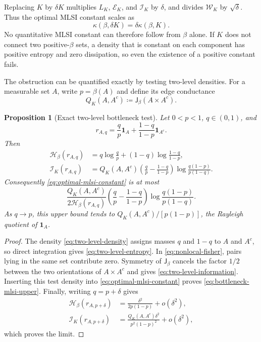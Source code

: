 \documentclass[11pt]{article}
\newtheorem{proposition}[theorem]{Proposition}
\theoremstyle{definition}
\newcommand{\one}{\mathbf 1}
\newcommand{\cE}{\mathcal E}
\newcommand{\cI}{\mathcal I}
\newcommand{\cH}{\mathcal H}
\newcommand{\cW}{\mathcal W}
\newcommand{\Jm}{\mathsf J}
\begin{document}
Replacing $K$ by $\delta K$ multiplies $L_K$, $\cE_K$, and $\cI_K$ by
$\delta$, and divides $\cW_K$ by $\sqrt\delta$.  Thus the optimal MLSI
constant scales as
\begin{equation}\label{eq:kernel-scaling-pl}
  \kappa(\beta,\delta K)=\delta\kappa(\beta,K).
\end{equation}
No quantitative MLSI constant can therefore follow from $\beta$ alone.
If $K$ does not connect two positive-$\beta$ sets, a density that is constant
on each component has positive entropy and zero dissipation, so even the
existence of a positive constant fails.

The obstruction can be quantified exactly by testing two-level densities.
For a measurable set $A$, write $p=\beta(A)$ and define its edge conductance
\begin{equation}\label{eq:edge-conductance}
  Q_K(A,A^c)\coloneqq\Jm_\beta(A\times A^c).
\end{equation}

\begin{proposition}[Exact two-level bottleneck test]
\label{prop:two-level-bottleneck}
Let $0<p<1$, $q\in(0,1)$, and
\begin{equation}\label{eq:two-level-density}
  r_{A,q}=\frac{q}{p}\one_A+
          \frac{1-q}{1-p}\one_{A^c}.
\end{equation}
Then
\begin{align}
  \cH_\beta(r_{A,q})
  &=q\log\frac qp+(1-q)\log\frac{1-q}{1-p},
  \label{eq:two-level-entropy}\\
  \cI_K(r_{A,q})
  &=Q_K(A,A^c)
    \left(\frac qp-\frac{1-q}{1-p}\right)
    \log\frac{q(1-p)}{p(1-q)}.
  \label{eq:two-level-information}
\end{align}
Consequently \eqref{eq:optimal-mlsi-constant} is at most
\begin{equation}\label{eq:bottleneck-mlsi-upper}
  \frac{Q_K(A,A^c)}{2\cH_\beta(r_{A,q})}
    \left(\frac qp-\frac{1-q}{1-p}\right)
    \log\frac{q(1-p)}{p(1-q)}.
\end{equation}
As $q\to p$, this upper bound tends to
$Q_K(A,A^c)/[p(1-p)]$, the Rayleigh quotient of $\one_A$.
\end{proposition}

\begin{proof}
The density \eqref{eq:two-level-density} assigns masses $q$ and $1-q$ to
$A$ and $A^c$, so direct integration gives
\eqref{eq:two-level-entropy}.  In \eqref{eq:nonlocal-fisher}, pairs lying in
the same set contribute zero.  Symmetry of $\Jm_\beta$ cancels the factor
$1/2$ between the two orientations of $A\times A^c$ and gives
\eqref{eq:two-level-information}.  Inserting this test density into
\eqref{eq:optimal-mlsi-constant} proves \eqref{eq:bottleneck-mlsi-upper}.
Finally, writing $q=p+\delta$ gives
\begin{align*}
  \cH_\beta(r_{A,p+\delta})
  &=\frac{\delta^2}{2p(1-p)}+o(\delta^2),\\
  \cI_K(r_{A,p+\delta})
  &=\frac{Q_K(A,A^c)\delta^2}{p^2(1-p)^2}+o(\delta^2),
\end{align*}
which proves the limit.
\end{proof}
\end{document}
